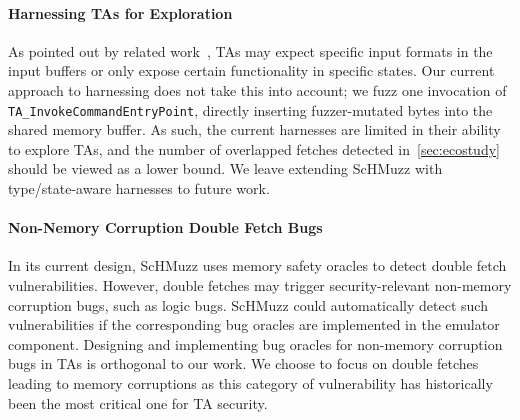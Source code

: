 \documentclass[conference]{IEEEtran}
\newcommand{\sysname}{ScHMuzz\xspace}
\newcommand{\stagetwo}{Fetch-Anchored Fuzzing\xspace}
\newcommand{\numvulns}{six\xspace}
\begin{document}
\paragraph{Harnessing TAs for Exploration}
As pointed out by related work~\cite{teezz,syncemu}, TAs may 
expect specific input formats in the input buffers or only expose certain functionality 
in specific states. Our current approach to harnessing does not take this into account; we fuzz 
one invocation of \texttt{TA\_InvokeCommandEntryPoint}, directly inserting fuzzer-mutated bytes 
into the shared memory buffer. As such, the current harnesses are limited in their ability to 
explore TAs, and the number of overlapped fetches detected in~\autoref{sec:ecostudy} should 
be viewed as a lower bound. We leave extending \sysname with type/state-aware harnesses to 
future work. 

\paragraph{Non-Nemory Corruption Double Fetch Bugs}
In its current design, \sysname uses memory safety oracles to detect double fetch vulnerabilities. 
However, double fetches may trigger security-relevant non-memory corruption 
bugs, such as logic bugs. \sysname could automatically detect such vulnerabilities if 
the corresponding bug oracles are implemented in the emulator component. Designing and implementing 
bug oracles for non-memory corruption bugs in TAs is orthogonal to our work. We choose to 
focus on double fetches leading to memory corruptions as this category of vulnerability has 
historically been the most critical one for TA security.

\end{document}
